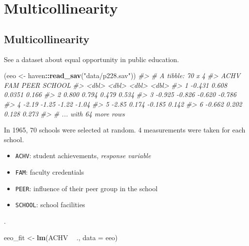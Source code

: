 \documentclass[]{book}
\newenvironment{Shaded}{\begin{snugshade}}{\end{snugshade}}
\newcommand{\CommentTok}[1]{\textcolor[rgb]{0.56,0.35,0.01}{\textit{#1}}}
\newcommand{\DataTypeTok}[1]{\textcolor[rgb]{0.13,0.29,0.53}{#1}}
\newcommand{\KeywordTok}[1]{\textcolor[rgb]{0.13,0.29,0.53}{\textbf{#1}}}
\newcommand{\NormalTok}[1]{#1}
\newcommand{\OperatorTok}[1]{\textcolor[rgb]{0.81,0.36,0.00}{\textbf{#1}}}
\newcommand{\StringTok}[1]{\textcolor[rgb]{0.31,0.60,0.02}{#1}}
\providecommand{\tightlist}{%
  \setlength{\itemsep}{0pt}\setlength{\parskip}{0pt}}
\theoremstyle{definition}
\theoremstyle{definition}
\theoremstyle{definition}
\theoremstyle{remark}
\begin{document}
\hypertarget{coll}{%
\chapter{Multicollinearity}\label{coll}}

\hypertarget{multicollinearity}{%
\section{Multicollinearity}\label{multicollinearity}}

See a dataset about equal opportunity in public education.

\begin{Shaded}
\begin{Highlighting}[]
\NormalTok{(eeo <-}\StringTok{ }\NormalTok{haven}\OperatorTok{::}\KeywordTok{read_sav}\NormalTok{(}\StringTok{"data/p228.sav"}\NormalTok{))}
\CommentTok{#> # A tibble: 70 x 4}
\CommentTok{#>     ACHV    FAM    PEER SCHOOL}
\CommentTok{#>    <dbl>  <dbl>   <dbl>  <dbl>}
\CommentTok{#> 1 -0.431  0.608  0.0351  0.166}
\CommentTok{#> 2  0.800  0.794  0.479   0.534}
\CommentTok{#> 3 -0.925 -0.826 -0.620  -0.786}
\CommentTok{#> 4 -2.19  -1.25  -1.22   -1.04 }
\CommentTok{#> 5 -2.85   0.174 -0.185   0.142}
\CommentTok{#> 6 -0.662  0.202  0.128   0.273}
\CommentTok{#> # ... with 64 more rows}
\end{Highlighting}
\end{Shaded}

In 1965, 70 schools were selected at random. 4 measurements were taken for each school.

\begin{itemize}
\tightlist
\item
  \texttt{ACHV}: student achievements, \emph{response variable}
\item
  \texttt{FAM}: faculty credentials
\item
  \texttt{PEER}: influence of their peer group in the school
\item
  \texttt{SCHOOL}: school facilities
\end{itemize}

\citep{Chatterjee:2015aa}.

\begin{Shaded}
\begin{Highlighting}[]
\NormalTok{eeo_fit <-}\StringTok{ }\KeywordTok{lm}\NormalTok{(ACHV }\OperatorTok{~}\StringTok{ }\NormalTok{., }\DataTypeTok{data =}\NormalTok{ eeo)}
\end{Highlighting}
\end{Shaded}
\end{document}
